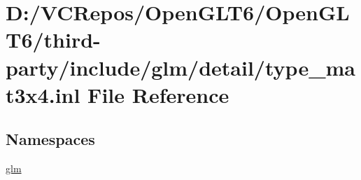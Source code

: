 \hypertarget{type__mat3x4_8inl}{}\section{D\+:/\+V\+C\+Repos/\+Open\+G\+L\+T6/\+Open\+G\+L\+T6/third-\/party/include/glm/detail/type\+\_\+mat3x4.inl File Reference}
\label{type__mat3x4_8inl}
\subsection*{Namespaces}
\begin{DoxyCompactItemize}
\item 
 \mbox{\hyperlink{namespaceglm}{glm}}
\end{DoxyCompactItemize}
